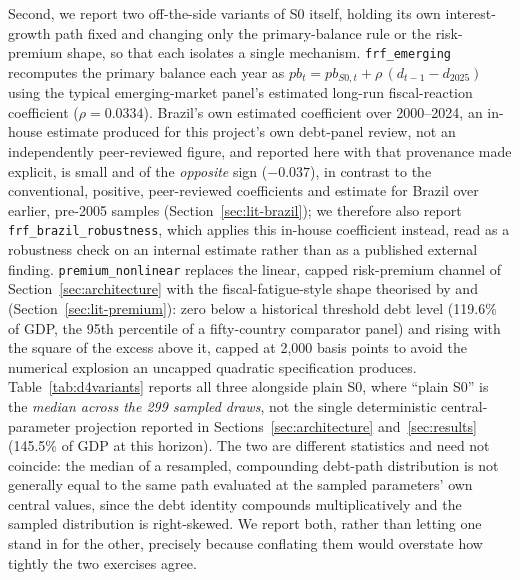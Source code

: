 \documentclass[11pt,a4paper]{article}
\begin{document}
Second, we report two off-the-side variants of \textsc{S0} itself, holding its own interest-growth path fixed and changing only the primary-balance rule or the risk-premium shape, so that each isolates a single mechanism. \texttt{frf\_emerging} recomputes the primary balance each year as $pb_t = pb_{S0,t} + \rho\,(d_{t-1}-d_{2025})$ using the typical emerging-market panel's estimated long-run fiscal-reaction coefficient ($\rho=0.0334$). Brazil's own estimated coefficient over 2000--2024, an in-house estimate produced for this project's own debt-panel review, not an independently peer-reviewed figure, and reported here with that provenance made explicit, is small and of the \emph{opposite} sign ($-0.037$), in contrast to the conventional, positive, peer-reviewed coefficients \citet{demello2008} and \citet{mendoncasantossachsida2009} estimate for Brazil over earlier, pre-2005 samples (Section~\ref{sec:lit-brazil}); we therefore also report \texttt{frf\_brazil\_robustness}, which applies this in-house coefficient instead, read as a robustness check on an internal estimate rather than as a published external finding. \texttt{premium\_nonlinear} replaces the linear, capped risk-premium channel of Section~\ref{sec:architecture} with the fiscal-fatigue-style shape theorised by \citet{ghoshkimmendozaostryqureshi2013} and \citet{bi2012} (Section~\ref{sec:lit-premium}): zero below a historical threshold debt level (119.6\% of GDP, the 95th percentile of a fifty-country comparator panel) and rising with the square of the excess above it, capped at 2,000 basis points to avoid the numerical explosion an uncapped quadratic specification produces. Table~\ref{tab:d4variants} reports all three alongside plain \textsc{S0}, where ``plain \textsc{S0}'' is the \emph{median across the 299 sampled draws}, not the single deterministic central-parameter projection reported in Sections~\ref{sec:architecture} and~\ref{sec:results} (145.5\% of GDP at this horizon). The two are different statistics and need not coincide: the median of a resampled, compounding debt-path distribution is not generally equal to the same path evaluated at the sampled parameters' own central values, since the debt identity compounds multiplicatively and the sampled distribution is right-skewed. We report both, rather than letting one stand in for the other, precisely because conflating them would overstate how tightly the two exercises agree.
\end{document}
